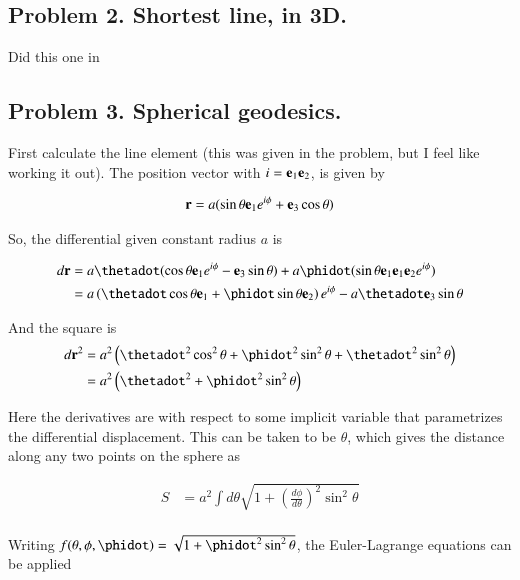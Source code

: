 \documentclass{article}
\begin{document}
\subsection{ Problem 2. Shortest line, in 3D. }

Did this one in \cite{PJgoldch1}

\subsection{ Problem 3.  Spherical geodesics. }

First calculate the line element (this was given in the problem, but I feel like working it out).
The position vector with $i = \mathbf{e}_1 \mathbf{e}_2$, is given by

\begin{align*}
\mathbf{r} = a ( \sin\theta \mathbf{e}_1 e^{i\phi} + \mathbf{e}_3 \cos\theta )
\end{align*}

So, the differential given constant radius $a$ is

\begin{align*}
d\Br 
&= 
a \thetadot ( \cos\theta \Be_1 e^{i\phi} - \Be_3 \sin\theta )
+ a \phidot ( \sin\theta \Be_1 \Be_1 \Be_2 e^{i\phi} ) \\
&= 
a \left( \thetadot \cos\theta \Be_1 + \phidot \sin\theta \Be_2 \right) e^{i\phi} - a \thetadot \Be_3 \sin\theta \\
\end{align*}

And the square is
\begin{align*}
d\Br^2
&= a^2 \left( \thetadot^2 \cos^2\theta + \phidot^2 \sin^2\theta + \thetadot^2 \sin^2\theta \right) \\
&= a^2 \left( \thetadot^2 + \phidot^2 \sin^2\theta \right) \\
\end{align*}

Here the derivatives are with respect to some implicit variable that parametrizes the differential displacement.
This can be taken to be $\theta$, which gives the distance along any two points on the sphere as

\begin{align*}
S &= a^2 \int d\theta \sqrt{1 + \left(\frac{d\phi}{d\theta}\right)^2 \sin^2\theta } \\
\end{align*}

Writing $f(\theta, \phi, \phidot) = \sqrt{1 + \phidot^2 \sin^2\theta}$, the Euler-Lagrange equations can be
applied
\end{document}
